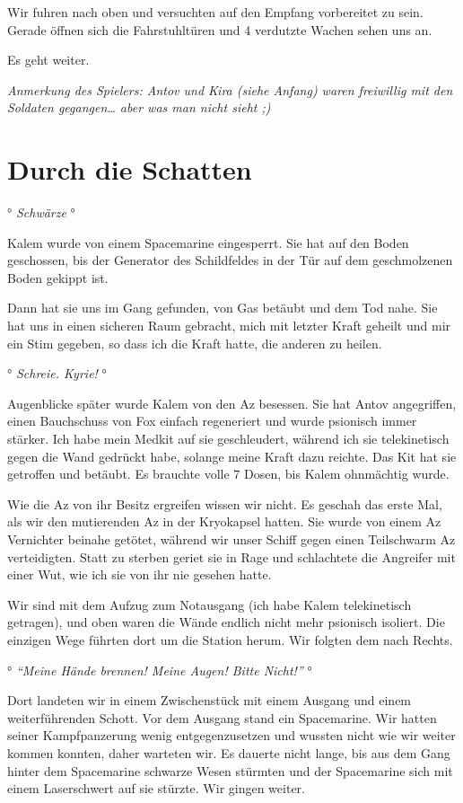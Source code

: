 \documentclass[11pt]{scrartcl}
\begin{document}
Wir fuhren nach oben und versuchten auf den Empfang vorbereitet zu sein.
Gerade öffnen sich die Fahrstuhltüren und 4 verdutzte Wachen sehen uns
an.

Es geht weiter.

\emph{Anmerkung des Spielers: Antov und Kira (siehe Anfang) waren
freiwillig mit den Soldaten gegangen\ldots{} aber was man nicht sieht
;)}

\section{Durch die Schatten}

° \emph{Schwärze} °

Kalem wurde von einem Spacemarine eingesperrt. Sie hat auf den Boden
geschossen, bis der Generator des Schildfeldes in der Tür auf dem
geschmolzenen Boden gekippt ist.

Dann hat sie uns im Gang gefunden, von Gas betäubt und dem Tod nahe. Sie
hat uns in einen sicheren Raum gebracht, mich mit letzter Kraft geheilt
und mir ein Stim gegeben, so dass ich die Kraft hatte, die anderen zu
heilen.

° \emph{Schreie. Kyrie!} °

Augenblicke später wurde Kalem von den Az besessen. Sie hat Antov
angegriffen, einen Bauchschuss von Fox einfach regeneriert und wurde
psionisch immer stärker. Ich habe mein Medkit auf sie geschleudert,
während ich sie telekinetisch gegen die Wand gedrückt habe, solange
meine Kraft dazu reichte. Das Kit hat sie getroffen und betäubt. Es
brauchte volle 7 Dosen, bis Kalem ohnmächtig wurde.

Wie die Az von ihr Besitz ergreifen wissen wir nicht. Es geschah das
erste Mal, als wir den mutierenden Az in der Kryokapsel hatten. Sie
wurde von einem Az Vernichter beinahe getötet, während wir unser Schiff
gegen einen Teilschwarm Az verteidigten. Statt zu sterben geriet sie in
Rage und schlachtete die Angreifer mit einer Wut, wie ich sie von ihr
nie gesehen hatte.

Wir sind mit dem Aufzug zum Notausgang (ich habe Kalem telekinetisch
getragen), und oben waren die Wände endlich nicht mehr psionisch
isoliert. Die einzigen Wege führten dort um die Station herum. Wir
folgten dem nach Rechts.

° \emph{``Meine Hände brennen! Meine Augen! Bitte Nicht!''} °

Dort landeten wir in einem Zwischenstück mit einem Ausgang und einem
weiterführenden Schott. Vor dem Ausgang stand ein Spacemarine. Wir
hatten seiner Kampfpanzerung wenig entgegenzusetzen und wussten nicht
wie wir weiter kommen konnten, daher warteten wir. Es dauerte nicht
lange, bis aus dem Gang hinter dem Spacemarine schwarze Wesen stürmten
und der Spacemarine sich mit einem Laserschwert auf sie stürzte. Wir
gingen weiter.
\end{document}
